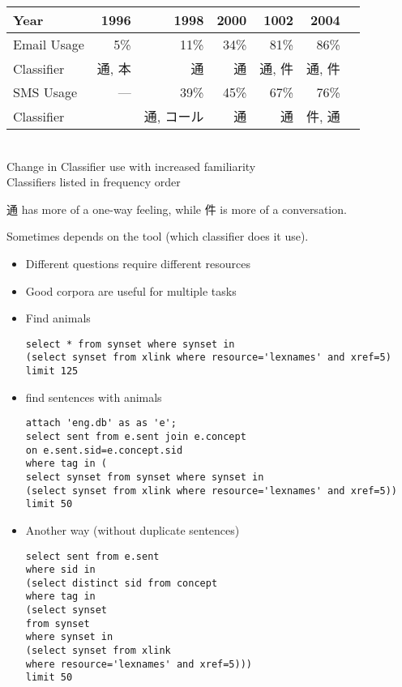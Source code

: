\documentclass[a4paper,landscape,headrule,footrule,xetex]{foils}
\begin{document}
\begin{center}
  \begin{tabular}{lrrrrrr}
    Year &  1996 & 1998 & 2000 & 1002 & 2004 \\ \hline
    Email Usage & 5\% & 11\% & 34\% & 81\% & 86\%\\
    Classifier  & 通, 本  & 通  & 通 & 通, 件 & 通, 件 \\
    SMS  Usage &   ---  & 39\% & 45\% & 67\% & 76\%\\
    Classifier  &  &  通, コール  & 通  & 通 & 件, 通 \\
  \end{tabular}
  \\[2ex] Change in Classifier use with increased familiarity
  \\ Classifiers listed in frequency order
\end{center}

通 has more of a one-way feeling, while  件 is more of a conversation.

Sometimes depends on the tool (which classifier does it use).


\begin{itemize}
\item Different questions require different resources
\item Good corpora are useful for multiple tasks
\end{itemize}



\begin{itemize}
\item Find animals
\begin{verbatim}
select * from synset where synset in 
(select synset from xlink where resource='lexnames' and xref=5)
limit 125
\end{verbatim}
\item find sentences with animals
\begin{verbatim}
attach 'eng.db' as as 'e';
select sent from e.sent join e.concept 
on e.sent.sid=e.concept.sid
where tag in (
select synset from synset where synset in 
(select synset from xlink where resource='lexnames' and xref=5))
limit 50
\end{verbatim}
\newpage
\item Another way (without duplicate sentences)

\begin{verbatim}
select sent from e.sent 
where sid in 
(select distinct sid from concept
where tag in 
(select synset 
from synset 
where synset in 
(select synset from xlink 
where resource='lexnames' and xref=5)))
limit 50
\end{verbatim}
\end{itemize}
\end{document}
